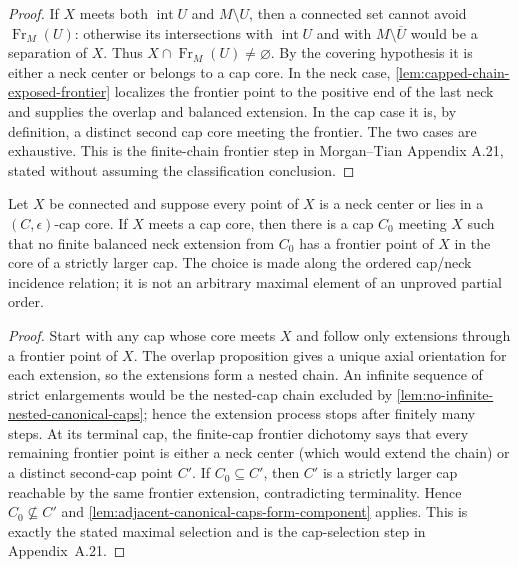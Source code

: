 \begin{proof}
If $X$ meets both $\operatorname{int}U$ and $M\setminus U$, then a connected
set cannot avoid $\operatorname{Fr}_M(U)$: otherwise its intersections with
$\operatorname{int}U$ and with $M\setminus\overline U$ would be a separation
of $X$.  Thus $X\cap\operatorname{Fr}_M(U)\ne\varnothing$.  By the
covering hypothesis it is either a neck center or belongs to a cap core.  In
the neck case, \ref{lem:capped-chain-exposed-frontier} localizes the frontier
point to the positive end of the last neck and supplies the overlap and
balanced extension.  In the cap case it is, by definition, a distinct second
cap core meeting the frontier.  The
two cases are exhaustive.  This is the finite-chain frontier step in
Morgan--Tian Appendix A.21, stated without assuming the classification
conclusion.
\end{proof}

\begin{lemma}
\label{lem:maximal-cap-selection}
\notready
Let $X$ be connected and suppose every point of $X$ is a neck center or lies
in a $(C,\epsilon)$-cap core.  If $X$ meets a cap core, then there is a cap
$C_0$ meeting $X$ such that no finite balanced neck extension from $C_0$ has a
frontier point of $X$ in the core of a strictly larger cap.  The choice is
made along the ordered cap/neck incidence relation; it is not an arbitrary
maximal element of an unproved partial order.
\end{lemma}

\begin{proof}
Start with any cap whose core meets $X$ and follow only extensions through a
frontier point of $X$.  The overlap proposition gives a unique axial
orientation for each extension, so the extensions form a nested chain.  An
infinite sequence of strict enlargements would be the nested-cap chain
excluded by \ref{lem:no-infinite-nested-canonical-caps}; hence the extension
process stops after finitely many steps.  At its terminal cap, the finite-cap
frontier dichotomy says that every remaining frontier point is either a neck
center (which would extend the chain) or a distinct second-cap point $C'$.
If $C_0\subseteq C'$, then $C'$ is a strictly larger cap reachable by the same
frontier extension, contradicting terminality.  Hence $C_0\nsubseteq C'$ and
\ref{lem:adjacent-canonical-caps-form-component} applies.  This is exactly the
stated maximal selection and is the cap-selection step in Appendix~A.21.
\end{proof}

